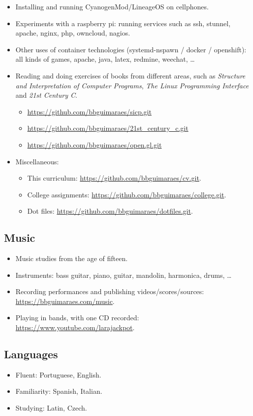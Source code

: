 \begin{itemize}
    \item Installing and running CyanogenMod/LineageOS on cellphones.
    \item
        Experiments with a raspberry pi: running services such as ssh, stunnel,
        apache, nginx, php, owncloud, nagios.
    \item
        Other uses of container technologies (systemd-nspawn / docker /
        openshift): all kinds of games, apache, java, latex, redmine, weechat,
        …
    \item
        Reading and doing exercises of books from different areas, such as
        \textit{Structure and Interpretation of Computer Programs}, \textit{The
        Linux Programming Interface} and \textit{21st Century C}.
        \begin{itemize}
            \item \url{https://github.com/bbguimaraes/sicp.git}
            \item \url{https://github.com/bbguimaraes/21st_century_c.git}
            \item \url{https://github.com/bbguimaraes/open.gl.git}
        \end{itemize}
    \item Miscellaneous:
        \begin{itemize}
            \item
                This curriculum:
                \url{https://github.com/bbguimaraes/cv.git}.
            \item
                College assignments:
                \url{https://github.com/bbguimaraes/college.git}.
            \item
                Dot files:
                \url{https://github.com/bbguimaraes/dotfiles.git}.
        \end{itemize}
\end{itemize}

\subsection*{Music}

\begin{itemize}
    \item Music studies from the age of fifteen.
    \item
        Instruments: bass guitar, piano, guitar, mandolin, harmonica, drums, …
    \item
        Recording performances and publishing videos/scores/sources:
        \url{https://bbguimaraes.com/music}.
    \item
        Playing in bands, with one CD recorded:
        \url{https://www.youtube.com/larajackpot}.
\end{itemize}

\subsection*{Languages}

\begin{itemize}
    \item Fluent: Portuguese, English.
    \item Familiarity: Spanish, Italian.
    \item Studying: Latin, Czech.
\end{itemize}
